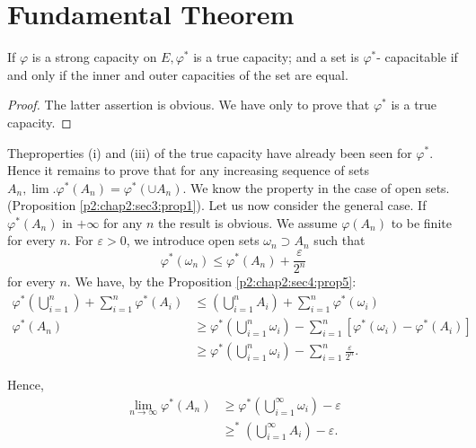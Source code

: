 \section{Fundamental Theorem}\label{p2:chap2:sec6} %

\begin{thm}\label{p2:chap2:sec6:thm2}%
  If $\varphi$ is a strong capacity on $E, \varphi^*$ is a true
  capacity; and a set is $\varphi^*$- capacitable if and only if the
  inner and outer capacities of the set are equal. 
\end{thm}

\begin{proof} %
  The latter assertion is obvious. We have only to prove that
  $\varphi^*$ is a true capacity. 
\end{proof}

The\pageoriginale properties (i) and (iii) of the true capacity have already
been seen for $\varphi^*$. Hence it remains to prove that for any
increasing sequence of sets $A_n, \lim. \varphi^* (A_n) = \varphi^*
(\cup A_n)$. We know the property in the case of open
sets. (Proposition \ref{p2:chap2:sec3:prop1}). Let us now consider the general case. If
$\varphi^* (A_n)$ in $+ \infty $ for any $n$ the result is obvious. We
assume $\varphi(A_n)$ to be finite for every $n$. For $\varepsilon >
0$, we introduce open sets $\omega_n \supset A_n$ such that 
$$
\varphi^* (\omega_n) \le \varphi^* (A_n) + \frac{\varepsilon}{2^n}
$$
for every $n$. We have, by the Proposition \ref{p2:chap2:sec4:prop5}:
\begin{align*}
  \varphi^* \left(\bigcup^{n}_{i = 1} \right)  + \sum^{n}_{i = 1}
  \varphi^* (A_i) 
  & \le \left(\bigcup^{n}_{i = 1} A_i\right) + \sum^{n}_{i = 1} \varphi^*
  (\omega_i)\\ 
  \varphi^* (A_n) & \ge \varphi^* \left(\bigcup^{n}_{i = 1} \omega_i\right) -
  \sum^{n}_{i = 1} \left[ \varphi^*(\omega_i) - \varphi^*
    (A_i)\right]\hspace{2cm}\\  
  & \ge \varphi^* \left(\bigcup^{n}_{i = 1} \omega_i\right) - \sum^{n}_{i = 1}
      \frac{\varepsilon}{2^n}.
      \end{align*}

Hence,
\begin{align*}
\lim\limits_{n \to \infty} \varphi^*
      (A_n) & \ge \varphi^* 
      \left(\bigcup\limits^{\infty}_{i = 1} \omega_i\right) -\varepsilon\\  
      & \ge ^* \left(\bigcup^{\infty}_{i = 1} A_i\right)  - \varepsilon.
\end{align*}

